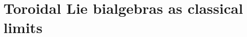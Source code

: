         \chapter{Toroidal Lie bialgebras as classical limits} \label{chapter: classical_limits_of_affine_yangians}
            \begin{abstract}
                
            \end{abstract}
    
            \minitoc

            
    
            
    
            

    \newpage

    \printbibliography

